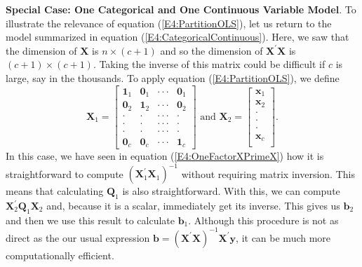 \linejed

\textbf{Special Case: One Categorical and One Continuous Variable Model}.
To illustrate the relevance of equation (\ref{E4:PartitionOLS}), let us return to
the model summarized in equation (\ref{E4:CategoricalContinuous}). Here,
we saw that the dimension of $\mathbf{X}$ is $n \times (c+1)$ and so the dimension of
$\mathbf{X}^{\prime}\mathbf{X}$ is $(c+1) \times (c+1)$. Taking the inverse of this
matrix could be difficult if $c$ is large, say in the thousands. To apply equation
(\ref{E4:PartitionOLS}), we define
\begin{equation*}
\mathbf{X}_1=
\begin{bmatrix}
\mathbf{1}_1 & \mathbf{0}_1 & \cdot \cdot \cdot  & \mathbf{0}
_1 \\
\mathbf{0}_2 & \mathbf{1}_2 & \cdot \cdot \cdot  & \mathbf{0}
_2 \\
\cdot  & \cdot  & \cdot \cdot \cdot  & \cdot  \\
\cdot  & \cdot  & \cdot \cdot \cdot  & \cdot  \\
\cdot  & \cdot  & \cdot \cdot \cdot  & \cdot  \\
\mathbf{0}_{c} & \mathbf{0}_{c} & \cdot \cdot \cdot  & \mathbf{1}_c
\end{bmatrix}
\text{ \ \ \ \ and \ \ \ }\mathbf{X}_2 =
\begin{bmatrix}
\mathbf{x}_1\\
\mathbf{x}_2 \\
\cdot  \\
\cdot  \\
\cdot  \\
\mathbf{x}_c \\
\end{bmatrix} .
\end{equation*}
In this case, we have seen in equation (\ref{E4:OneFactorXPrimeX}) how it
is straightforward to compute
$\left(\mathbf{X}_1^{\prime}\mathbf{X}_1 \right)^{-1}$ without requiring
matrix inversion. This means that calculating $\mathbf{Q}_1$ is also straightforward. With this,
we can compute $\mathbf{X}_2^{\prime} \mathbf{Q}_1 \mathbf{X}_2$ and, because it is a scalar,
immediately get its inverse. This gives us $\mathbf{b}_2$ and then we use this result to
calculate $\mathbf{b}_1$. Although this procedure is not as direct as the our usual expression
$\mathbf{b} = \left( \mathbf{X}^{\prime}\mathbf{X}\right)^{-1}
\mathbf{X}^{\prime}\mathbf{y}$, it can be much more computationally efficient.

\linejed

